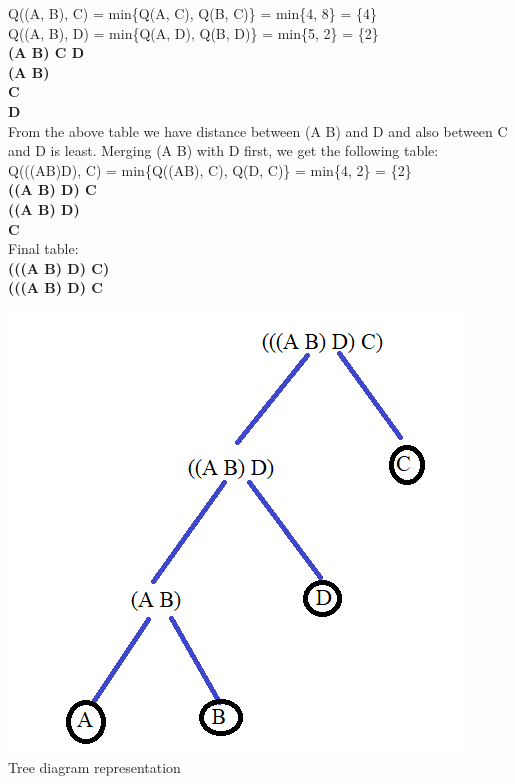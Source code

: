 \documentclass[12pt]{article}
\begin{document}
\begin{enumerate}
	Q((A, B), C) = min\{Q(A, C), Q(B, C)\} = min\{4, 8\} = \{4\} \\
	Q((A, B), D) = min\{Q(A, D), Q(B, D)\} =  min\{5, 2\} = \{2\} \\
\newpage	
\qquad \quad \quad \textbf{(A B) \quad C \quad \quad D} \\
    
\textbf{(A B)}            \\  
     
\textbf{C}     \quad \quad {} \qquad {}          \\    
    
\textbf{D}    \quad \quad {} \qquad {} \qquad {}  \\


From the above table we have distance between (A B) and D and also between C and D is least. Merging (A B) with D first, we get the following table:\\


Q(((AB)D), C) = min\{Q((AB), C), Q(D, C)\} = min\{4, 2\} = \{2\} \\


     \qquad \quad \quad \quad \quad \textbf{((A B) D) \quad C} \\

\textbf{((A B) D)}            \\

\quad \textbf{C}     \quad \quad \qquad {} \qquad {} \\

Final table: \\

\qquad \qquad \qquad \qquad \textbf{(((A B) D) C)} \\

\textbf{(((A B) D) C} \qquad \qquad {} \\

\begin{center}
	\includegraphics[width=0.5\columnwidth]{Tree} \\
	Tree diagram representation \\
\end{center}



\end{enumerate}
\end{document}
